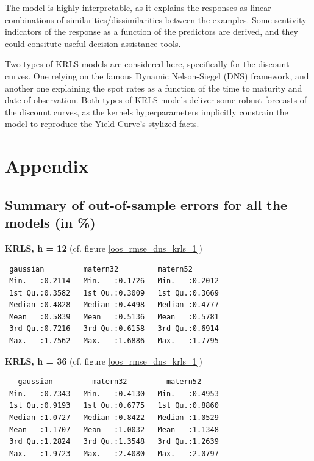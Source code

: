 The model is highly interpretable, as it explains the responses as linear combinations of similarities/dissimilarities between the examples. Some sentivity indicators of the response as a function of the predictors are derived, and they could consitute useful decision-assistance tools. 

Two types of KRLS models are considered here, specifically for the discount curves. One relying on the famous Dynamic Nelson-Siegel (DNS) framework, and another one explaining the spot rates as a function of the time to maturity and date of observation. Both types of KRLS models deliver some robust forecasts of the discount curves, as the kernels hyperparameters implicitly constrain the model to reproduce the Yield Curve's stylized facts. 

\newpage

\section{Appendix}

\subsection{Summary of out-of-sample errors for all the models (in \%)}
\label{appendix_oos_rmse}

\textbf{KRLS, h = 12} (cf. figure \ref{oos_rmse_dns_krls_1})

\begin{verbatim}
 gaussian         matern32         matern52     
 Min.   :0.2114   Min.   :0.1726   Min.   :0.2012  
 1st Qu.:0.3582   1st Qu.:0.3009   1st Qu.:0.3669  
 Median :0.4828   Median :0.4498   Median :0.4777  
 Mean   :0.5839   Mean   :0.5136   Mean   :0.5781  
 3rd Qu.:0.7216   3rd Qu.:0.6158   3rd Qu.:0.6914  
 Max.   :1.7562   Max.   :1.6886   Max.   :1.7795  
\end{verbatim}

\textbf{KRLS, h = 36} (cf. figure \ref{oos_rmse_dns_krls_1}) 

\begin{verbatim}
   gaussian         matern32         matern52     
 Min.   :0.7343   Min.   :0.4130   Min.   :0.4953  
 1st Qu.:0.9193   1st Qu.:0.6775   1st Qu.:0.8860  
 Median :1.0727   Median :0.8422   Median :1.0529  
 Mean   :1.1707   Mean   :1.0032   Mean   :1.1348  
 3rd Qu.:1.2824   3rd Qu.:1.3548   3rd Qu.:1.2639  
 Max.   :1.9723   Max.   :2.4080   Max.   :2.0797 
\end{verbatim}

